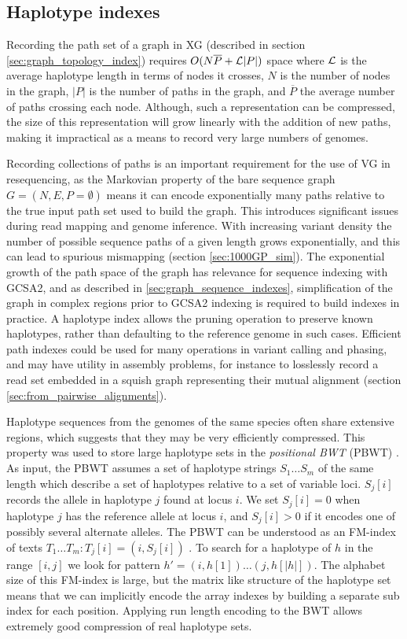 \subsection{Haplotype indexes}
Recording the path set of a graph in XG (described in section \ref{sec:graph_topology_index}) requires $O(N\overline{P} + {\cal L}|P|)$ space where ${\cal L}$ is the average haplotype length in terms of nodes it crosses, $N$ is the number of nodes in the graph, $|P|$ is the number of paths in the graph, and $\overline{P}$ the average number of paths crossing each node.
Although, such a representation can be compressed, the size of this representation will grow linearly with the addition of new paths, making it impractical as a means to record very large numbers of genomes.

Recording collections of paths is an important requirement for the use of VG in resequencing, as the Markovian property of the bare sequence graph $G = (N, E, P= \emptyset)$ means it can encode exponentially many paths relative to the true input path set used to build the graph.
This introduces significant issues during read mapping and genome inference.
With increasing variant density the number of possible sequence paths of a given length grows exponentially, and this can lead to spurious mismapping (section \ref{sec:1000GP_sim}).
The exponential growth of the path space of the graph has relevance for sequence indexing with GCSA2, and as described in \ref{sec:graph_sequence_indexes}, simplification of the graph in complex regions prior to GCSA2 indexing is required to build indexes in practice.
A haplotype index allows the pruning operation to preserve known haplotypes, rather than defaulting to the reference genome in such cases.
Efficient path indexes could be used for many operations in variant calling and phasing, and may have utility in assembly problems, for instance to losslessly record a read set embedded in a squish graph representing their mutual alignment (section \ref{sec:from_pairwise_alignments}).

Haplotype sequences from the genomes of the same species often share extensive regions, which suggests that they may be very efficiently compressed.
This property was used to store large haplotype sets in the \emph{positional BWT} (PBWT) \cite{durbin2014efficient}.
As input, the PBWT assumes a set of haplotype strings $S_1 \ldots S_m$ of the same length which describe a set of haplotypes relative to a set of variable loci.
$S_j[i]$ records the allele in haplotype $j$ found at locus $i$.
We set $S_j[i] = 0$ when haplotype $j$ has the reference allele at locus $i$, and $S_j[i] > 0$ if it encodes one of possibly several alternate alleles.
The PBWT can be understood as an FM-index of texts $T_1 \ldots T_m : T_j[i] = (i, S_j[i])$ \cite{gagie2017wheeler}.
To search for a haplotype of $h$ in the range $[i,j]$ we look for pattern $h' = (i, h[1]) \ldots (j, h[|h|])$.
The alphabet size of this FM-index is large, but the matrix like structure of the haplotype set means that we can implicitly encode the array indexes by building a separate sub index for each position.
Applying run length encoding to the BWT allows extremely good compression of real haplotype sets.

